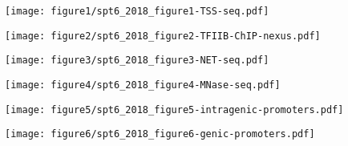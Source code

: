 \documentclass[9pt, letterpaper]{extarticle}
\begin{document}
{\centering \texttt{[image: figure1/spt6\_2018\_figure1-TSS-seq.pdf]}\par}

\newpage

{\centering \texttt{[image: figure2/spt6\_2018\_figure2-TFIIB-ChIP-nexus.pdf]}\par}

\newpage

{\texttt{[image: figure3/spt6\_2018\_figure3-NET-seq.pdf]}}

\newpage

{\centering \texttt{[image: figure4/spt6\_2018\_figure4-MNase-seq.pdf]}\par}

\newpage

{\centering \texttt{[image: figure5/spt6\_2018\_figure5-intragenic-promoters.pdf]}\par}

\newpage

{\centering \texttt{[image: figure6/spt6\_2018\_figure6-genic-promoters.pdf]}\par}
\end{document}
